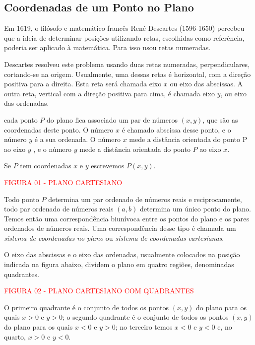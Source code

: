 \documentclass[oneside,a4paper,12pt]{article}
\begin{document}
\subsection{Coordenadas de um Ponto no Plano}

Em 1619, o filósofo e matemático francês René Descartes (1596-1650) percebeu que a ideia de determinar posições utilizando retas, escolhidas como referência, poderia ser aplicado à matemática. Para isso usou retas numeradas.

Descartes resolveu este problema usando duas retas numeradas, perpendiculares, cortando-se na origem. Usualmente, uma dessas retas é horizontal, com a direção positiva para a direita. Esta reta será chamada eixo $x$ ou eixo das abscissas. A outra reta, vertical com a direção positiva para cima, é chamada eixo $y$, ou eixo das ordenadas. 

 cada ponto $P$ do plano fica associado um par de números $(x,y)$, que são as coordenadas deste ponto. O número $x$ é chamado abscissa desse ponto, e o número $y$ é a sua ordenada. O número $x$ mede a distância orientada do ponto P ao eixo $y$ , e o número $y$ mede a distância orientada do ponto $P$ ao eixo $x$.
	
Se $P$ tem coordenadas $x$ e $y$ escrevemos $P(x,y)$.

\vspace{190pt}
\begin{center}
	\textcolor{red}{FIGURA 01 - PLANO CARTESIANO}
\end{center}

Todo ponto $P$ determina um par ordenado de números reais e reciprocamente, todo par ordenado de números reais $(a,b)$ determina um único ponto do plano. Temos então uma correspondência biunívoca entre os pontos do plano e os pares ordenados de números reais. Uma correspondência desse tipo é chamada um {\it sistema de coordenadas no plano} ou {\it sistema de coordenadas cartesianas}.

O eixo das abscissas e o eixo das ordenadas, usualmente colocados na posição indicada na figura abaixo, dividem o plano em quatro regiões, denominadas quadrantes.

\vspace{180pt}
\begin{center}
	\textcolor{red}{FIGURA 02 - PLANO CARTESIANO COM QUADRANTES}
\end{center}
 
 O primeiro quadrante é o conjunto de todos os pontos $(x,y)$ do plano para os quais $x>0$ e $y>0$; o segundo quadrante é o conjunto de todos os pontos $(x,y)$ do plano para os quais $x<0$ e $y>0$; no terceiro temos $x<0$ e $y<0$ e, no quarto, $x>0$ e $y<0$.  
 
\end{document}
